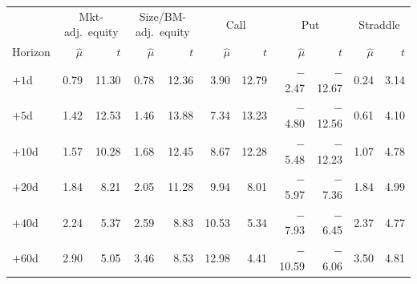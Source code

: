 {\small
\begin{adjustbox}{max width=\linewidth}
\begin{tabular}{lrrrrrrrrrr}
\toprule
 & \multicolumn{2}{c}{Mkt-adj.\ equity} & \multicolumn{2}{c}{Size/BM-adj.\ equity} & \multicolumn{2}{c}{Call} & \multicolumn{2}{c}{Put} & \multicolumn{2}{c}{Straddle}\\
\cmidrule(lr){2-3}\cmidrule(lr){4-5}\cmidrule(lr){6-7}\cmidrule(lr){8-9}\cmidrule(lr){10-11}
Horizon & $\hat\mu$ & $t$ & $\hat\mu$ & $t$ & $\hat\mu$ & $t$ & $\hat\mu$ & $t$ & $\hat\mu$ & $t$ \\
\midrule
$+1$d & 0.79 & 11.30 & 0.78 & 12.36 & 3.90 & 12.79 & $-$2.47 & $-$12.67 & 0.24 & 3.14 \\
$+5$d & 1.42 & 12.53 & 1.46 & 13.88 & 7.34 & 13.23 & $-$4.80 & $-$12.56 & 0.61 & 4.10 \\
$+10$d & 1.57 & 10.28 & 1.68 & 12.45 & 8.67 & 12.28 & $-$5.48 & $-$12.23 & 1.07 & 4.78 \\
$+20$d & 1.84 & 8.21 & 2.05 & 11.28 & 9.94 & 8.01 & $-$5.97 & $-$7.36 & 1.84 & 4.99 \\
$+40$d & 2.24 & 5.37 & 2.59 & 8.83 & 10.53 & 5.34 & $-$7.93 & $-$6.45 & 2.37 & 4.77 \\
$+60$d & 2.90 & 5.05 & 3.46 & 8.53 & 12.98 & 4.41 & $-$10.59 & $-$6.06 & 3.50 & 4.81 \\
\bottomrule
\end{tabular}
\end{adjustbox}
}
